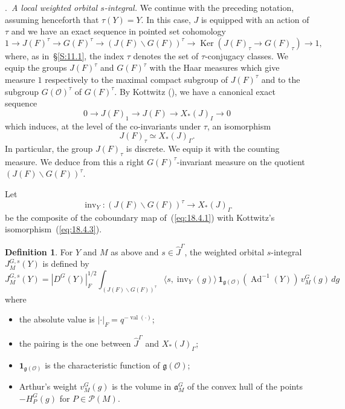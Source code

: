 \documentclass[12pt,a4paper,oneside,english,leqno]{smfart}
\makeatletter
\numberwithin{equation}{subsection}
\newcounter{theo}
\numberwithin{theo}{subsection}
\newenvironment{paragr}[1][]{\medskip\refstepcounter{subsection}%
  \par\noindent\hspace*{\parindent}\thesubsection.\ \emph{#1}%
  \@ifundefined{@empty}{}{}\ignorespaces}{\medskip}
\theoremstyle{plain}
\theoremstyle{definition}
\newtheorem{definition}[theo]{Definition}
\theoremstyle{remark}
\DeclareMathOperator{\Ad}{Ad}
\DeclareMathOperator{\inv}{inv}
\DeclareMathOperator{\Ker}{Ker}
\DeclareMathOperator{\val}{val}
\newcommand{\oc}{\mathcal{O}}
\newcommand{\pc}{\mathcal{P}}
\newcommand{\ggo}{\mathfrak{g}}
\newcommand{\ago}{\mathfrak{a}}
\newcommand{\Ga}{\Gamma}
\newcommand{\back}{\backslash}
\newcommand{\bg}{\langle}
\newcommand{\bd}{\rangle}
\makeatother
\begin{document}
\begin{paragr}[A local weighted orbital $s$-integral.]\label{S:18.4}
We continue with the preceding notation, assuming henceforth that $\tau(Y)=Y$. In this case, $J$ is equipped with an action of $\tau$ and we have an exact sequence in pointed set cohomology
\begin{equation}\label{eq:18.4.1}
1\longrightarrow J(F)^\tau\longrightarrow G(F)^\tau\longrightarrow
(J(F)\back G(F))^\tau\longrightarrow \Ker(J(F)_\tau\to G(F)_\tau)\longrightarrow 1,
\end{equation}
where, as in~\S\ref{S:11.1}, the index $\tau$ denotes the set of $\tau$-conjugacy classes. We equip the groups $J(F)^\tau$ and $G(F)^\tau$ with the Haar measures which give measure $1$ respectively to the maximal compact subgroup of $J(F)^\tau$ and to the subgroup $G(\oc)^\tau$ of $G(F)^\tau$. By Kottwitz (\cite[\S7.6]{Kottwitz-isocrystals-II}), we have a canonical exact sequence
\begin{equation}\label{eq:18.4.2}
0\longrightarrow J(F)_1\longrightarrow J(F)\longrightarrow X_*(J)_I\longrightarrow 0
\end{equation}
which induces, at the level of the co-invariants under $\tau$, an isomorphism
\begin{equation}\label{eq:18.4.3}
J(F)_\tau\simeq X_*(J)_\Ga.
\end{equation}
In particular, the group $J(F)_\tau$ is discrete. We equip it with the counting measure. We deduce from this a right $G(F)^\tau$-invariant measure on the quotient $(J(F)\back G(F))^\tau$.

Let
$$
\inv_Y:(J(F)\back G(F))^\tau\to X_*(J)_\Ga
$$
be the composite of the coboundary map of~(\ref{eq:18.4.1}) with Kottwitz's isomorphism~(\ref{eq:18.4.3}).

\begin{definition}\label{thm:18.4.1}
For $Y$ and $M$ as above and $s\in\hat{J}^\Ga$, the weighted orbital $s$-integral $J_M^{G,s}(Y)$ is defined by
\begin{equation}\label{eq:18.4.4}
J_M^{G,s}(Y)=|D^G(Y)|_F^{1/2}\int_{(J(F)\back G(F))^\tau}
\bg s,\inv_Y(g)\bd\,\mathbf{1}_{\ggo(\oc)}(\Ad^{-1}(Y))\,v_M^G(g)\,dg
\end{equation}
where
\begin{itemize}
\item[--] the absolute value is $|\cdot|_F=q^{-\val(\cdot)}$; \item[--] the pairing is the one between $\hat{J}^\Ga$ and $X_*(J)_\Ga$; \item[--] $\mathbf{1}_{\ggo(\oc)}$ is the characteristic function of $\ggo(\oc)$; \item[--] Arthur's weight $v_M^G(g)$ is the volume in $\ago_M^G$ of the convex hull of the points $-H_P^G(g)$ for $P\in\pc(M)$.
\end{itemize}
\end{definition}
\end{paragr}
\end{document}
